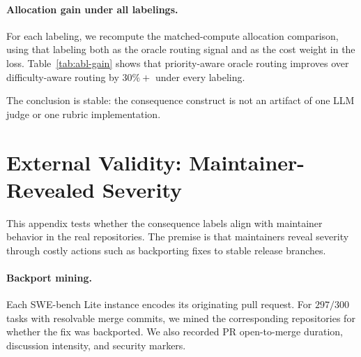 \documentclass{article}
\begin{document}
\paragraph{Allocation gain under all labelings.}
For each labeling, we recompute the matched-compute allocation
comparison, using that labeling both as the oracle routing signal and
as the cost weight in the loss. Table~\ref{tab:abl-gain} shows that
priority-aware oracle routing improves over difficulty-aware routing
by $30\%+$ under every labeling.

\begin{table}[h]
\centering
\caption{\textbf{Rubric ablation: allocation gain.} Cost-weighted loss
at the matched top-$25\%$ premium budget, recomputed under each
labeling pipeline.}
\label{tab:abl-gain}
\small
{}
\end{table}

The conclusion is stable: the consequence construct is not an artifact
of one LLM judge or one rubric implementation.

\section{External Validity: Maintainer-Revealed Severity}
\label{app:realcost}

This appendix tests whether the consequence labels align with
maintainer behavior in the real repositories. The premise is that
maintainers reveal severity through costly actions such as backporting
fixes to stable release branches.

\paragraph{Backport mining.}
Each SWE-bench Lite instance encodes its originating pull request. For
$297/300$ tasks with resolvable merge commits, we mined the
corresponding repositories for whether the fix was backported. We also
recorded PR open-to-merge duration, discussion intensity, and security
markers.
\end{document}
